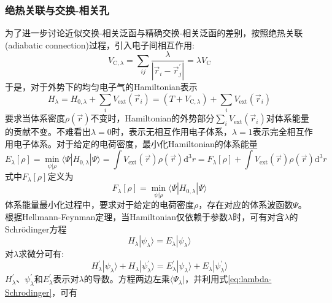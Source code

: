 \subsubsection{绝热关联与交换-相关孔}
为了进一步讨论近似交换-相关泛函与精确交换-相关泛函的差别，按照绝热关联\textrm{(adiabatic connection)}过程，引入电子间相互作用:
\begin{equation}
	V_{\mathrm{C},\lambda}=\sum_{ij}\dfrac{\lambda}{|\vec r_i-\vec r^{\prime}_j|}=\lambda V_{\mathrm{C}}
	\label{eq:electron-electron}
\end{equation}
于是，对于外势下的均匀电子气的\textrm{Hamiltonian}表示
\begin{equation}
	H_{\lambda}=H_{0,\lambda}+\sum_iV_{\mathrm{ext}}(\vec r_i)=(T+V_{\mathrm{C},\lambda})+\sum_iV_{\mathrm{ext}}(\vec r_i)
	\label{eq:H-interaction}
\end{equation}
要求当体系密度$\rho(\vec r)$不变时，\textrm{Hamiltonian}的外势部分$\sum\limits_iV_{\mathrm{ext}}(\vec r_i)$对体系能量的贡献不变。不难看出$\lambda=0$时，表示无相互作用电子体系，$\lambda=1$表示完全相互作用电子体系。对于给定的电荷密度，最小化\textrm{Hamiltonian}的体系能量
\begin{equation}
	E_{\lambda}[\rho]=\min_{\psi|\rho}\langle\Psi|H_{0,\lambda}|\Psi\rangle=\int V_{\mathrm{ext}}(\vec r)\rho(\vec r)\mathrm{d}^3r=F_{\lambda}[\rho]+\int V_{\mathrm{ext}}(\vec r)\rho(\vec r)\mathrm{d}^3 r
	\label{eq:min-E}
\end{equation}
式中$F_{\lambda}[\rho]$定义为
\begin{equation}
	F_{\lambda}[\rho]=\min_{\psi|\rho}\langle\Psi|H_{0,\lambda}|\Psi\rangle
	\label{eq:General-Functional-lambda}
\end{equation}
体系能量最小化过程中，要求对于给定的电荷密度$\rho$，存在对应的体系波函数$\Psi$。根据\textrm{Hellmann-Feynman}定理，当\textrm{Hamiltonian}仅依赖于参数$\lambda$时，可有对含$\lambda$的\textrm{Schr\"odinger}方程
\begin{equation}
	H_{\lambda}|\psi_{\lambda}\rangle=E_{\lambda}|\psi_{\lambda}\rangle
	\label{eq:lambda-Schrodinger}
\end{equation}
对$\lambda$求微分可有:
\begin{equation}
	H_{\lambda}^{\prime}|\psi_{\lambda}\rangle+H_{\lambda}|\psi_{\lambda}^{\prime}\rangle=E_{\lambda}^{\prime}|\psi_{\lambda}\rangle+E_{\lambda}|\psi_{\lambda}^{\prime}\rangle
	\label{eq:Hellmann-Feynman}
\end{equation}
$H_{\lambda}^{\prime}$、$\psi_{\lambda}^{\prime}$和$E_{\lambda}^{\prime}$表示对$\lambda$的导数。方程两边左乘$\langle\Psi_{\lambda}|$，并利用式\eqref{eq:lambda-Schrodinger}，可有
